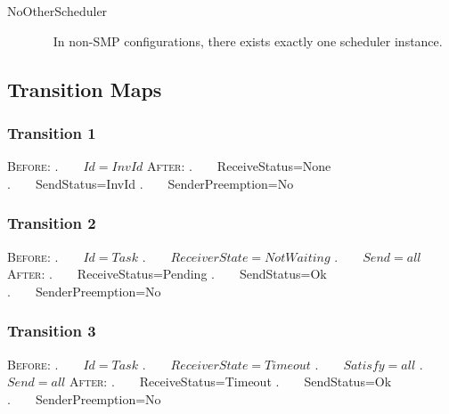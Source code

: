 \begin{description}
  \item[NoOtherScheduler]~
    In non-SMP configurations, there exists exactly one scheduler instance.
\end{description}

\newpage


\subsection{Transition Maps}



\subsubsection{Transition 1}


\textsc{Before:}
\newline.~~~~$Id=InvId$
\newline\textsc{After:}
\newline.~~~~ReceiveStatus=None
\newline.~~~~SendStatus=InvId
\newline.~~~~SenderPreemption=No

\subsubsection{Transition 2}


\textsc{Before:}
\newline.~~~~$Id=Task$
\newline.~~~~$ReceiverState=NotWaiting$
\newline.~~~~$Send=all$
\newline\textsc{After:}
\newline.~~~~ReceiveStatus=Pending
\newline.~~~~SendStatus=Ok
\newline.~~~~SenderPreemption=No

\subsubsection{Transition 3}


\textsc{Before:}
\newline.~~~~$Id=Task$
\newline.~~~~$ReceiverState=Timeout$
\newline.~~~~$Satisfy=all$
\newline.~~~~$Send=all$
\newline\textsc{After:}
\newline.~~~~ReceiveStatus=Timeout
\newline.~~~~SendStatus=Ok
\newline.~~~~SenderPreemption=No

